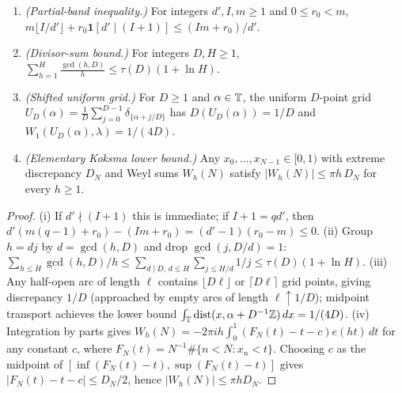 \documentclass[11pt]{article}
\newcommand{\fr}[1]{\{#1\}}
\begin{document}
\begin{lemma}\label{lem:four-finite}
\begin{enumerate}[label=\textup{(\roman*)},nosep]
\item \emph{(Partial-band inequality.)} For integers $d',I,m\ge1$ and $0\le r_0<m$, $m\lfloor I/d'\rfloor+r_0\mathbf 1[d'\mid(I+1)]\le(Im+r_0)/d'$.
\item \emph{(Divisor-sum bound.)} For integers $D,H\ge1$, $\sum_{h=1}^H\frac{\gcd(h,D)}{h}\le\tau(D)(1+\ln H)$.
\item \emph{(Shifted uniform grid.)} For $D\ge1$ and $\alpha\in\mathbb T$, the uniform $D$-point grid $U_D(\alpha)=\frac1D\sum_{j=0}^{D-1}\delta_{\fr{\alpha+j/D}}$ has $D(U_D(\alpha))=1/D$ and $W_1(U_D(\alpha),\lambda)=1/(4D)$.
\item \emph{(Elementary Koksma lower bound.)} Any $x_0,\dots,x_{N-1}\in[0,1)$ with extreme discrepancy $D_N$ and Weyl sums $W_h(N)$ satisfy $|W_h(N)|\le\pi h\,D_N$ for every $h\ge1$.
\end{enumerate}
\end{lemma}

\begin{proof}
(i) If $d'\nmid(I+1)$ this is immediate; if $I+1=qd'$, then $d'(m(q-1)+r_0)-(Im+r_0)=(d'-1)(r_0-m)\le0$.
(ii) Group $h=dj$ by $d=\gcd(h,D)$ and drop $\gcd(j,D/d)=1$: $\sum_{h\le H}\gcd(h,D)/h\le\sum_{d\mid D,\,d\le H}\sum_{j\le H/d}1/j\le\tau(D)(1+\ln H)$.
(iii) Any half-open arc of length $\ell$ contains $\lfloor D\ell\rfloor$ or $\lceil D\ell\rceil$ grid points, giving discrepancy $1/D$ (approached by empty arcs of length $\ell\uparrow 1/D$); midpoint transport achieves the lower bound $\int_{\mathbb T}\operatorname{dist}(x,\alpha+D^{-1}\mathbb Z)\,dx=1/(4D)$.
(iv) Integration by parts gives $W_h(N)=-2\pi ih\int_0^1(F_N(t)-t-c)e(ht)\,dt$ for any constant $c$, where $F_N(t)=N^{-1}\#\{n<N:x_n<t\}$. Choosing $c$ as the midpoint of $[\inf(F_N(t)-t),\sup(F_N(t)-t)]$ gives $|F_N(t)-t-c|\le D_N/2$, hence $|W_h(N)|\le\pi h D_N$.
\end{proof}
\end{document}
